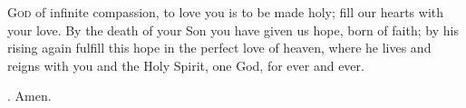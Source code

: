 \lettrine[lines=3,loversize=0.15]{G}{od} of infinite compassion,
to love you is to be made holy;
fill our hearts with your love.
By the death of your Son
you have given us hope, born of faith;
by his rising again
fulfill this hope
in the perfect love of heaven,
where he lives and reigns with you and the Holy Spirit,
one God, for ever and ever. \par \Rbar. Amen.
